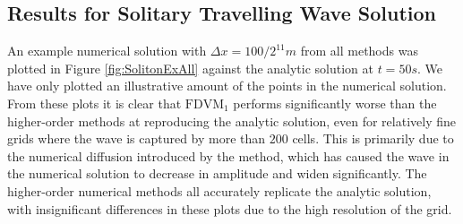 \subsection{Results for Solitary Travelling Wave Solution}
An example numerical solution with $\Delta x = {100} / {2^{11}}m$ from all methods was plotted in Figure \ref{fig:SolitonExAll} against the analytic solution at $t= 50s$. We have only plotted an illustrative amount of the points in the numerical solution. From these plots it is clear that $\text{FDVM}_1$ performs significantly worse than the higher-order methods at reproducing the analytic solution, even for relatively fine grids where the wave is captured by more than $200$ cells. This is primarily due to the numerical diffusion introduced by the method, which has caused the wave in the numerical solution to decrease in amplitude and widen significantly. The higher-order numerical methods all accurately replicate the analytic solution, with insignificant differences in these plots due to the high resolution of the grid.

